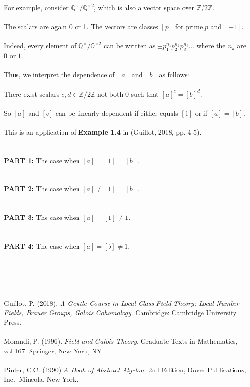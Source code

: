 \documentclass{article}
\begin{document}
\indent For example, consider $\mathbb{Q^\times}/\mathbb{Q}^{\times2}$, which is also a vector space over $\mathbb{Z}/2\mathbb{Z}$. \\\\
\indent The scalars are again 0 or 1. The vectors are classes $[p]$ for prime $p$ and $[-1]$. \\\\
\indent Indeed, every element of $\mathbb{Q^\times}/\mathbb{Q}^{\times2}$ can be written as $\pm p_1^{n_1} p_2^{n_2} p_3^{n_3}...$ where the $n_k$ are $0$ or $1$. \\\\
\indent Thus, we interpret the dependence of $[a]$ and $[b]$ as follows: \\\\
\indent \indent There exist scalars $c, d \in \mathbb{Z}/2\mathbb{Z}$ not both $0$ such that $[a]^c = [b]^d$. \\\\
\indent So $[a]$ and $[b]$ can be linearly dependent if either equals $[1]$ or if $[a] = [b]$. \\\\
\indent This is an application of \textbf{Example 1.4} in (Guillot, 2018, pp. 4-5). \\\\
\\
\noindent \textbf{PART 1:} The case when $[a] = [1] = [b]$. \\\\
\\
\noindent \textbf{PART 2:} The case when $[a] \neq [1] = [b] $. \\\\
\\
\noindent \textbf{PART 3:} The case when $[a] = [1] \neq 1$. \\\\
\\
\noindent \textbf{PART 4:} The case when $[a] = [b] \neq 1$. \\\\
\\
 \\\\\\
Guillot, P. (2018). \emph{A Gentle Course in Local Class Field Theory: Local Number Fields, Brauer Groups, Galois Cohomology}. Cambridge: Cambridge University Press. \\\\
Morandi, P. (1996). \emph{Field and Galois Theory}. Graduate Texts in Mathematics, vol 167. Springer, New York, NY. \\\\
Pinter, C.C. (1990) \emph{A Book of Abstract Algebra}. 2nd Edition, Dover Publications, Inc., Mineola, New York. \\\\
\end{document}
